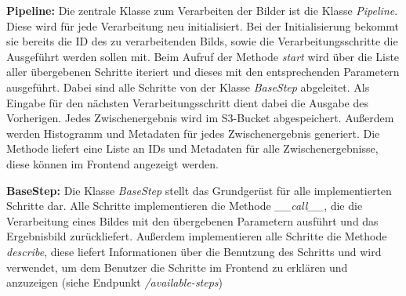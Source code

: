 \textbf{Pipeline:} Die zentrale Klasse zum Verarbeiten der Bilder ist die Klasse \textit{Pipeline}. Diese wird für jede Verarbeitung neu initialisiert. Bei der Initialisierung bekommt sie bereits die ID des zu verarbeitenden Bilds, sowie die Verarbeitungsschritte die Ausgeführt werden sollen mit. Beim Aufruf der Methode \textit{start} wird über die Liste aller übergebenen Schritte iteriert und dieses mit den entsprechenden Parametern ausgeführt. Dabei sind alle Schritte von der Klasse \textit{BaseStep} abgeleitet. Als Eingabe für den nächsten Verarbeitungsschritt dient dabei die Ausgabe des Vorherigen. Jedes Zwischenergebnis wird im S3-Bucket abgespeichert. Außerdem werden Histogramm und Metadaten für jedes Zwischenergebnis generiert. Die Methode liefert eine Liste an IDs und Metadaten für alle Zwischenergebnisse, diese können im Frontend angezeigt werden.

\textbf{BaseStep:} Die Klasse \textit{BaseStep} stellt das Grundgerüst für alle implementierten Schritte dar. Alle Schritte implementieren die Methode \textit{\_\_call\_\_}, die die Verarbeitung eines Bildes mit den übergebenen Parametern ausführt und das Ergebnisbild zurückliefert. Außerdem implementieren alle Schritte die Methode \textit{describe}, diese liefert Informationen über die Benutzung des Schritts und wird verwendet, um dem Benutzer die Schritte im Frontend zu erklären und anzuzeigen (siehe Endpunkt \textit{/available-steps})